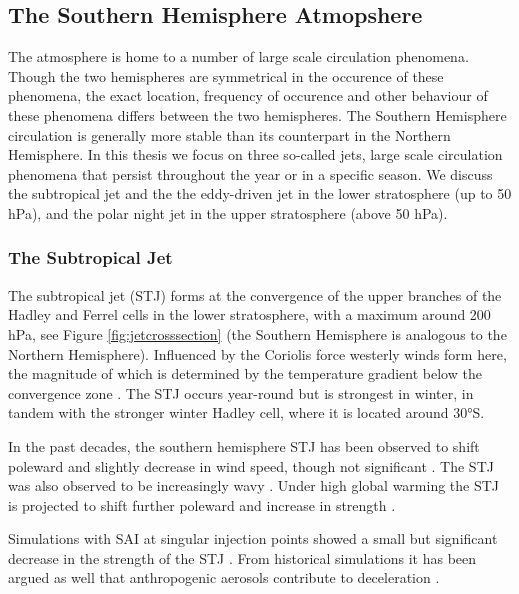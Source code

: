 \subsection{The Southern Hemisphere Atmopshere}
The atmosphere is home to a number of large scale circulation phenomena. Though the two hemispheres are symmetrical in the occurence of these phenomena, the exact location, frequency of occurence and other behaviour of these phenomena differs between the two hemispheres. The Southern Hemisphere circulation is generally more stable than its counterpart in the Northern Hemisphere. In this thesis we focus on three so-called jets, large scale circulation phenomena that persist throughout the year or in a specific season.
We discuss the subtropical jet and the the eddy-driven jet in the lower stratosphere (up to 50 hPa), and the polar night jet in the upper stratosphere (above 50 hPa).


\subsubsection{The Subtropical Jet}
The subtropical jet (STJ) forms at the convergence of the upper branches of the Hadley and Ferrel cells in the lower stratosphere, with a maximum around 200 hPa, see Figure \ref{fig:jetcrosssection} (the Southern Hemisphere is analogous to the Northern Hemisphere). Influenced by the Coriolis force westerly winds form here, the magnitude of which is determined by the temperature gradient below the convergence zone \parencite{zolotov2018variability}. The STJ occurs year-round but is strongest in winter, in tandem with the stronger winter Hadley cell, where it is located around 30°S.

In the past decades, the southern hemisphere STJ has been observed to shift poleward and slightly decrease in wind speed, though not significant \parencite{zolotov2018variability}. The STJ was also observed to be increasingly wavy \parencite{martin2023}. Under high global warming the STJ is projected to shift further poleward and increase in strength \parencite{chenoli2017historical}. 

Simulations with SAI at singular injection points showed a small but significant decrease in the strength of the STJ \parencite{richter2017}. From historical simulations it has been argued as well that anthropogenic aerosols contribute to deceleration \parencite{wang2020}.

